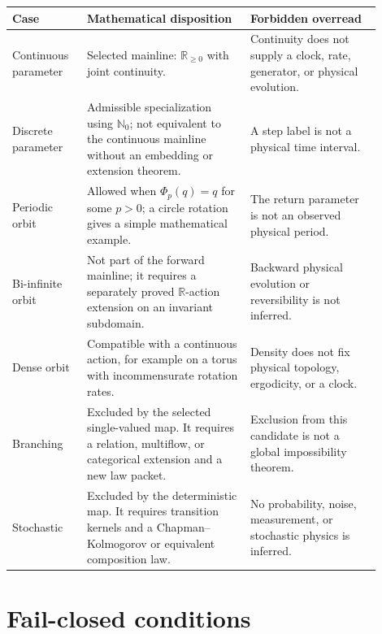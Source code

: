 \documentclass[11pt]{article}
\begin{document}
\begin{longtable}{p{0.18\linewidth}p{0.40\linewidth}p{0.32\linewidth}}
\toprule
Case & Mathematical disposition & Forbidden overread \\
\midrule
\endhead
Continuous parameter
& Selected mainline: \(\mathbb R_{\geq0}\) with joint continuity.
& Continuity does not supply a clock, rate, generator, or physical evolution.\\
Discrete parameter
& Admissible specialization using \(\mathbb N_0\); not equivalent to the
continuous mainline without an embedding or extension theorem.
& A step label is not a physical time interval.\\
Periodic orbit
& Allowed when \(\Phi_p(q)=q\) for some \(p>0\); a circle rotation gives a
simple mathematical example.
& The return parameter is not an observed physical period.\\
Bi-infinite orbit
& Not part of the forward mainline; it requires a separately proved
\(\mathbb R\)-action extension on an invariant subdomain.
& Backward physical evolution or reversibility is not inferred.\\
Dense orbit
& Compatible with a continuous action, for example on a torus with
incommensurate rotation rates.
& Density does not fix physical topology, ergodicity, or a clock.\\
Branching
& Excluded by the selected single-valued map. It requires a relation,
multiflow, or categorical extension and a new law packet.
& Exclusion from this candidate is not a global impossibility theorem.\\
Stochastic
& Excluded by the deterministic map. It requires transition kernels and a
Chapman--Kolmogorov or equivalent composition law.
& No probability, noise, measurement, or stochastic physics is inferred.\\
\bottomrule
\end{longtable}

\section{Fail-closed conditions}
\end{document}
